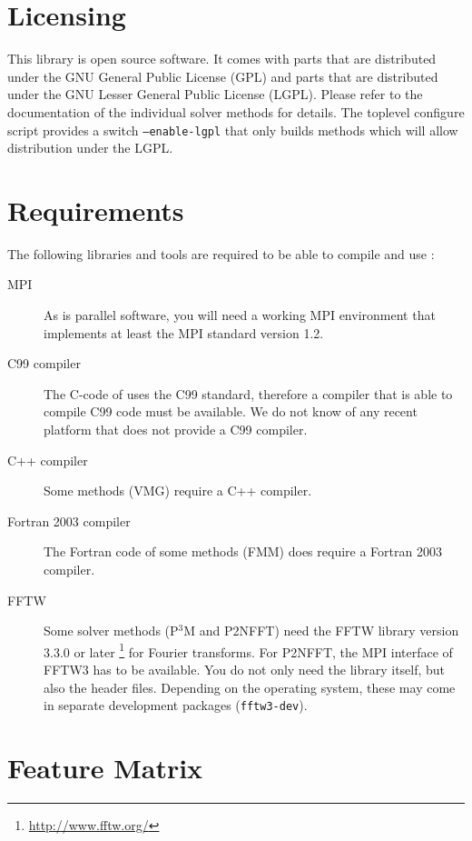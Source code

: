 \section{Licensing}

This library is open source software.  It comes with parts that are
distributed under the GNU General Public License (GPL) and parts that
are distributed under the GNU Lesser General Public License (LGPL).
Please refer to the documentation of the individual solver methods for
details.  The toplevel configure script provides a switch
\texttt{--enable-lgpl} that only builds methods which will allow
distribution under the LGPL.


\section{Requirements}
\label{sec:requirements}

The following libraries and tools are required to be able to compile
and use \fcs:

\begin{description}
\item[MPI]  As \fcs is parallel software, you will need a
  working MPI environment that implements at least the MPI standard
  version 1.2.
\item[C99 compiler]  The C-code of \fcs uses the C99
  standard, therefore a compiler that is able to compile C99 code must
  be available. We do not know of any recent platform that does not
  provide a C99 compiler.
\item[C++ compiler]  Some methods (\eg VMG) require a C++
  compiler.
\item[Fortran 2003 compiler]  The Fortran code of
  some methods (\eg FMM) does require a Fortran 2003 compiler.
\item[FFTW]  Some solver methods (\eg P$^3$M and P2NFFT)
  need the FFTW library version 3.3.0 or later
  \footnote{\url{http://www.fftw.org/}} for Fourier transforms.  For
  P2NFFT, the MPI interface of FFTW3 has to be available. You do
  not only need the library itself, but also the header files.
  Depending on the operating system, these may come in separate
  development packages (\eg \texttt{fftw3-dev}).
\end{description}

\section{Feature Matrix}
\label{sec:feature_matrix}

